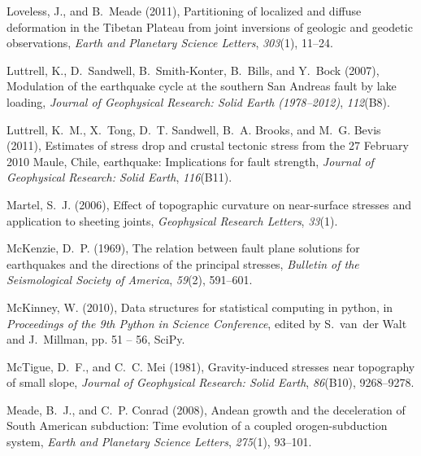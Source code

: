 \documentclass[draft,jgrga]{AGUTeX}
\begin{document}
\begin{article}
\begin{thebibliography}{90}
Loveless, J., and B.~Meade (2011), Partitioning of localized and diffuse
  deformation in the {T}ibetan {P}lateau from joint inversions of geologic and
  geodetic observations, \textit{Earth and Planetary Science Letters},
  \textit{303}(1), 11--24.

Luttrell, K., D.~Sandwell, B.~Smith-Konter, B.~Bills, and Y.~Bock (2007),
  Modulation of the earthquake cycle at the southern {S}an {A}ndreas fault by
  lake loading, \textit{Journal of Geophysical Research: Solid Earth
  (1978--2012)}, \textit{112}(B8).

Luttrell, K.~M., X.~Tong, D.~T. Sandwell, B.~A. Brooks, and M.~G. Bevis (2011),
  Estimates of stress drop and crustal tectonic stress from the 27 {F}ebruary
  2010 {M}aule, {C}hile, earthquake: Implications for fault strength,
  \textit{Journal of Geophysical Research: Solid Earth}, \textit{116}(B11).

Martel, S.~J. (2006), Effect of topographic curvature on near-surface stresses
  and application to sheeting joints, \textit{Geophysical Research Letters},
  \textit{33}(1).

McKenzie, D.~P. (1969), The relation between fault plane solutions for
  earthquakes and the directions of the principal stresses, \textit{Bulletin of
  the Seismological Society of America}, \textit{59}(2), 591--601.

McKinney, W. (2010), Data structures for statistical computing in python, in
  \textit{Proceedings of the 9th Python in Science Conference}, edited by
  S.~van~der Walt and J.~Millman, pp. 51 -- 56, SciPy.

McTigue, D.~F., and C.~C. Mei (1981), Gravity-induced stresses near topography
  of small slope, \textit{Journal of Geophysical Research: Solid Earth},
  \textit{86}(B10), 9268--9278.

Meade, B.~J., and C.~P. Conrad (2008), Andean growth and the deceleration of
  {S}outh {A}merican subduction: {T}ime evolution of a coupled
  orogen-subduction system, \textit{Earth and Planetary Science Letters},
  \textit{275}(1), 93--101.


\end{thebibliography}
\end{article}
\end{document}
